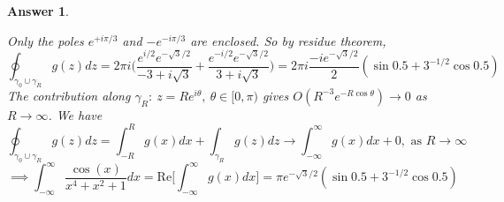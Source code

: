 \documentclass[a4paper]{article}
\newtheorem{ans}{Answer}[section]
\theoremstyle{new}
\begin{document}
\begin{ans}
\begin{enumerate}[label=(\alph*)]
\begin{center}
  \end{center}
Only the poles $e^{+i\pi/3}$ and $-e^{-i\pi/3}$ are enclosed. So by residue theorem,
$$\oint_{\gamma_0\cup\gamma_R}g(z)dz=2\pi i\bigg(\frac{e^{i/2}e^{-\sqrt{3}/2}}{-3+i\sqrt{3}}+\frac{e^{-i/2}e^{-\sqrt{3}/2}}{3+i\sqrt{3}}\bigg)=2\pi i\frac{-ie^{-\sqrt{3}/2}}{2}(\sin0.5+3^{-1/2}\cos0.5)$$
The contribution along $\gamma_R:~z=Re^{i\theta},~\theta\in[0,\pi)$ gives $O(R^{-3}e^{-R\cos\theta})\rightarrow0$ as $R\rightarrow\infty$. We have
$$\oint_{\gamma_0\cup\gamma_R}g(z)dz=\int_{-R}^R g(x)dx+\int_{\gamma_R}g(z)dz\rightarrow\int_{-\infty}^\infty g(x)dx+0,\text{ as }R\rightarrow\infty$$
$$\implies\int_{-\infty}^\infty\frac{\cos(x)}{x^4+x^2+1}dx=\text{Re}\bigg[\int_{-\infty}^\infty g(x)dx\bigg]=\pi e^{-\sqrt{3}/2}(\sin 0.5+3^{-1/2}\cos0.5)$$
\end{enumerate}
\end{ans}
\newpage
\end{document}
